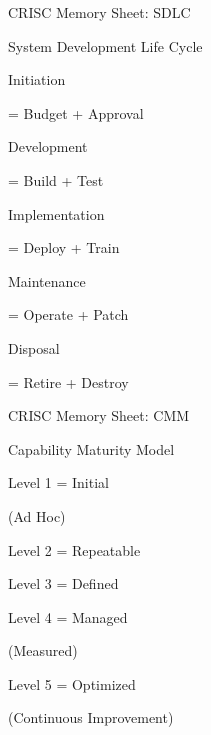 \documentclass{beamer}
\begin{document}
	\begin{frame}[shrink=10]{CRISC Memory Sheet: SDLC}
		\begin{block}{System Development Life Cycle}
			
			Initiation
			
			= Budget + Approval
			
			\vspace{0.1cm}
			
			Development
			
			= Build + Test
			
			\vspace{0.1cm}
			
			Implementation
			
			= Deploy + Train
			
			\vspace{0.1cm}
			
			Maintenance
			
			= Operate + Patch
			
			\vspace{0.1cm}
			
			Disposal
			
			= Retire + Destroy
			
		\end{block}
	\end{frame}
	
	\begin{frame}[shrink=10]{CRISC Memory Sheet: CMM}
		\begin{block}{Capability Maturity Model}
			
			Level 1 = Initial
			
			(Ad Hoc)
			
			\vspace{0.1cm}
			
			Level 2 = Repeatable
			
			\vspace{0.1cm}
			
			Level 3 = Defined
			
			\vspace{0.1cm}
			
			Level 4 = Managed
			
			(Measured)
			
			\vspace{0.1cm}
			
			Level 5 = Optimized
			
			(Continuous Improvement)
			
		\end{block}
	\end{frame}
	
\end{document}
